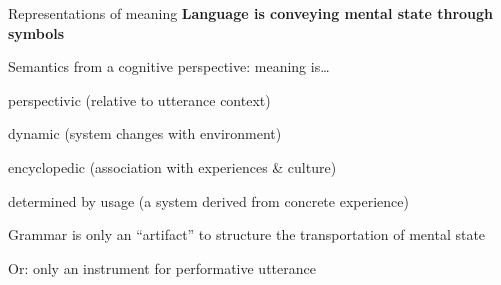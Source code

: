 \documentclass[aspectratio=169,cramped]{beamer}
\let\tempone\itemize
\let\temptwo\enditemize
\renewenvironment{itemize}{\tempone\addtolength{\itemsep}{-0\baselineskip}\addtolength{\parskip}{-0.2\baselineskip}}{\temptwo}
\begin{document}
\begin{frame}{Representations of meaning}
	\textbf{Language is conveying mental state through symbols}
  \begin{itemize}
  \item Semantics from a cognitive perspective: meaning is\ldots
    \begin{itemize}
    \item perspectivic (relative to utterance context)
    \item dynamic (system changes with environment)
    \item encyclopedic (association with experiences \& culture)
    \item determined by usage (a system derived from concrete experience)
    \end{itemize}
  \item Grammar is only an ``artifact'' to structure the transportation of mental state
    \begin{itemize}
    \item Or: only an instrument for performative utterance
    \end{itemize}

  \end{itemize}
\end{frame}
\end{document}
